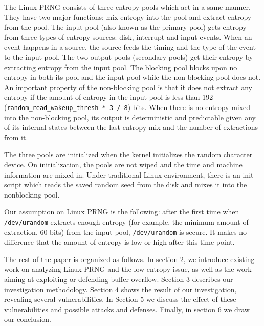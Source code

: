 The Linux PRNG consists of three entropy pools which act in a same manner. They have two major functions: mix entropy into the pool and extract entropy from the pool. The input pool (also known as the primary pool) gets entropy from three types of entropy sources: disk, interrupt and input events. When an event happens in a source, the source feeds the timing and the type of the event to the input pool. The two output pools (secondary pools) get their entropy by extracting entropy from the input pool. The blocking pool blocks upon no entropy in both its pool and the input pool while the non-blocking pool does not. An important property of the non-blocking pool is that it does not extract any entropy if the amount of entropy in the input pool is less than 192 (\verb|random_read_wakeup_thresh * 3 / 8|) bits. When there is no entropy mixed into the non-blocking pool, its output is deterministic and predictable given any of its internal states between the last entropy mix and the number of extractions from it. 

The three pools are initialized when the kernel initializes the random character device. On initialization, the pools are not wiped and the time and machine information are mixed in. Under traditional Linux environment, there is an init script which reads the saved random seed from the disk and mixes it into the nonblocking pool.

Our assumption on Linux PRNG is the following: after the first time when \verb|/dev/urandom| extracts enough entropy (for example, the minimum amount of extraction, 60 bits) from the input pool, \verb|/dev/urandom| is secure. It makes no difference that the amount of entropy is low or high after this time point.


The rest of the paper is organized as follows. In section 2, we introduce existing work on analyzing Linux PRNG and the low entropy issue, as well as the work aiming at exploiting or defending buffer overflow. Section 3 describes our investigation methodology. Section 4 shows the result of our investigation, revealing several vulnerabilities. In Section 5 we discuss the effect of these vulnerabilities and possible attacks and defenses. Finally, in section 6 we draw our conclusion.
